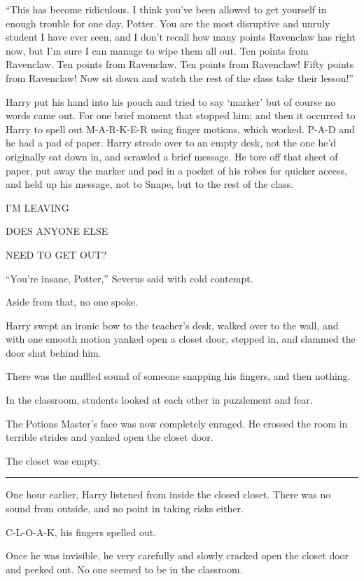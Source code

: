``This has become ridiculous. I think you've been allowed to get
yourself in enough trouble for one day, Potter. You are the most
disruptive and unruly student I have ever seen, and I don't recall how
many points Ravenclaw has right now, but I'm sure I can manage to wipe
them all out. Ten points from Ravenclaw. Ten points from Ravenclaw. Ten
points from Ravenclaw! Fifty points from Ravenclaw! Now sit down and
watch the rest of the class take their lesson!''

Harry put his hand into his pouch and tried to say `marker' but of
course no words came out. For one brief moment that stopped him; and
then it occurred to Harry to spell out M-A-R-K-E-R using finger motions,
which worked. P-A-D and he had a pad of paper. Harry strode over to an
empty desk, not the one he'd originally sat down in, and scrawled a
brief message. He tore off that sheet of paper, put away the marker and
pad in a pocket of his robes for quicker access, and held up his
message, not to Snape, but to the rest of the class.

I'M LEAVING

DOES ANYONE ELSE

NEED TO GET OUT?

``You're insane, Potter,'' Severus said with cold contempt.

Aside from that, no one spoke.

Harry swept an ironic bow to the teacher's desk, walked over to the
wall, and with one smooth motion yanked open a closet door, stepped in,
and slammed the door shut behind him.

There was the muffled sound of someone snapping his fingers, and then
nothing.

In the classroom, students looked at each other in puzzlement and fear.

The Potions Master's face was now completely enraged. He crossed the
room in terrible strides and yanked open the closet door.

The closet was empty.

\begin{center}\rule{3in}{0.4pt}\end{center}

One hour earlier, Harry listened from inside the closed closet. There
was no sound from outside, and no point in taking risks either.

C-L-O-A-K, his fingers spelled out.

Once he was invisible, he very carefully and slowly cracked open the
closet door and peeked out. No one seemed to be in the classroom.

